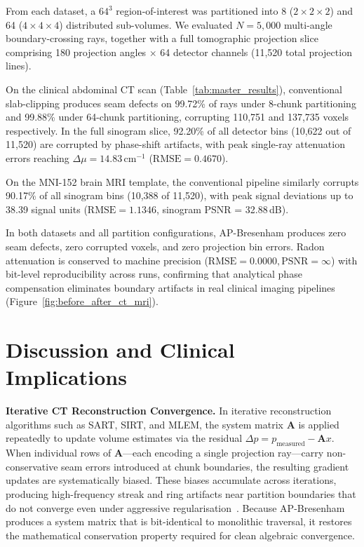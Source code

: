 \documentclass[conference]{IEEEtran}
\begin{document}
From each dataset, a $64^3$ region-of-interest was partitioned into 8 ($2 \times 2 \times 2$) and 64 ($4 \times 4 \times 4$) distributed sub-volumes. We evaluated $N = 5,000$ multi-angle boundary-crossing rays, together with a full tomographic projection slice comprising 180 projection angles $\times$ 64 detector channels (11,520 total projection lines).

On the clinical abdominal CT scan (Table~\ref{tab:master_results}), conventional slab-clipping produces seam defects on 99.72\% of rays under 8-chunk partitioning and 99.88\% under 64-chunk partitioning, corrupting 110,751 and 137,735 voxels respectively. In the full sinogram slice, 92.20\% of all detector bins (10,622 out of 11,520) are corrupted by phase-shift artifacts, with peak single-ray attenuation errors reaching $\Delta \mu = 14.83$\,cm$^{-1}$ ($\mathrm{RMSE} = 0.4670$).

On the MNI-152 brain MRI template, the conventional pipeline similarly corrupts 90.17\% of all sinogram bins (10,388 of 11,520), with peak signal deviations up to 38.39 signal units ($\mathrm{RMSE} = 1.1346$, sinogram PSNR = 32.88\,dB).

In both datasets and all partition configurations, AP-Bresenham produces zero seam defects, zero corrupted voxels, and zero projection bin errors. Radon attenuation is conserved to machine precision ($\mathrm{RMSE} = 0.0000, \mathrm{PSNR} = \infty$) with bit-level reproducibility across runs, confirming that analytical phase compensation eliminates boundary artifacts in real clinical imaging pipelines (Figure~\ref{fig:before_after_ct_mri}).

\section{Discussion and Clinical Implications}
\label{sec:discussion}

\textbf{Iterative CT Reconstruction Convergence.}
In iterative reconstruction algorithms such as SART, SIRT, and MLEM, the system matrix $\mathbf{A}$ is applied repeatedly to update volume estimates via the residual $\Delta p = p_{\mathrm{measured}} - \mathbf{A} x$. When individual rows of $\mathbf{A}$---each encoding a single projection ray---carry non-conservative seam errors introduced at chunk boundaries, the resulting gradient updates are systematically biased. These biases accumulate across iterations, producing high-frequency streak and ring artifacts near partition boundaries that do not converge even under aggressive regularisation~\cite{zhang2023distributed,chen2023exact,wang2025distributed}. Because AP-Bresenham produces a system matrix that is bit-identical to monolithic traversal, it restores the mathematical conservation property required for clean algebraic convergence.
\end{document}
